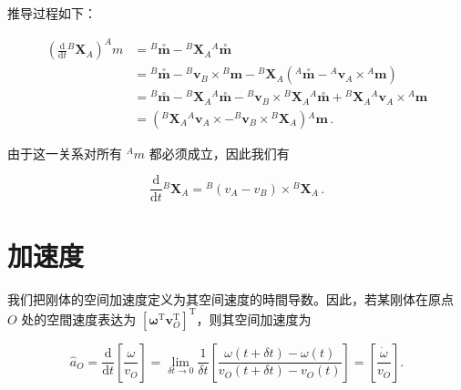 \documentclass[10pt,a4paper]{book}
\theoremstyle{thmstyle} %
\theoremstyle{defstyle} %
\theoremstyle{prostyle} %
\begin{document}
推导过程如下：



$$
\begin{array}{rl} { \left( \frac { \mathrm { d } } { \mathrm { d } t } { ^ B } \boldsymbol { X } _ { A } \right) ^{A}   m } & { = { ^ B }   \stackrel { \circ } { \boldsymbol { m } } - { ^ B }   \boldsymbol { X } _ { A } { ^ A }   \stackrel { \circ } { \boldsymbol { m } } } \\& { = { ^ B }   \stackrel { \circ } { \boldsymbol { m } } - { ^ B }   \boldsymbol { v } _ { B } \times { ^ B }   \boldsymbol { m } - { ^ B }   \boldsymbol { X } _ { A } ( { ^ A }   \stackrel { \circ } { \boldsymbol { m } } - { ^ A }   \boldsymbol { v } _ { A } \times { ^ A }   \boldsymbol { m } ) } \\& { = { ^ B }   \stackrel { \circ } { \boldsymbol { m } } - { ^ B }   \boldsymbol { X } _ { A } { ^ A }   \stackrel { \circ } { \boldsymbol { m } } - { ^ B }   \boldsymbol { v } _ { B } \times { ^ B }   \boldsymbol { X } _ { A } { ^ A }   \stackrel { \circ } { \boldsymbol { m } } + { ^ B }   \boldsymbol { X } _ { A } { ^ A }   \boldsymbol { v } _ { A } \times { ^ A }   \boldsymbol { m } } \\& { = \left( { ^ B }   \boldsymbol { X } _ { A } { ^ A }   \boldsymbol { v } _ { A } \times { - ^ B }   \boldsymbol { v } _ { B } \times { ^ B }   \boldsymbol { X } _ { A } \right) { ^ A }   \boldsymbol { m } \, . } \end{array}
$$



由于这一关系对所有 $^{A}m$ 都必须成立，因此我们有



$$
\frac { \mathrm { d } } { \mathrm { d } t } { } ^{B} \mathbf { X } _ { A } = { } ^{B} ( v _ { A } - v _ { B } ) \times { } ^{B} \mathbf { X } _ { A } \, .
$$



\section{加速度}





我们把刚体的空间加速度定义为其空间速度的時間导数。因此，若某刚体在原点 $O$ 处的空間速度表达为 $[\boldsymbol{\omega}^{\mathrm{T}}\boldsymbol{v}_{O}^{\mathrm{T}}]^{\mathrm{T}}$，则其空间加速度为



$$
\hat { a } _ { O } = \frac { \mathrm { d } } { \mathrm { d } t } \left[ \frac { \omega } { v _ { O } } \right] = \operatorname* { l i m } _ { \delta t \to 0 } \frac { 1 } { \delta t } \left[ \frac { \omega ( t + \delta t ) - \omega ( t ) } { v _ { O } ( t + \delta t ) - v _ { O } ( t ) } \right] = \left[ \frac { \dot { \omega } } { v _ { O } } \right] .
$$
\end{document}

